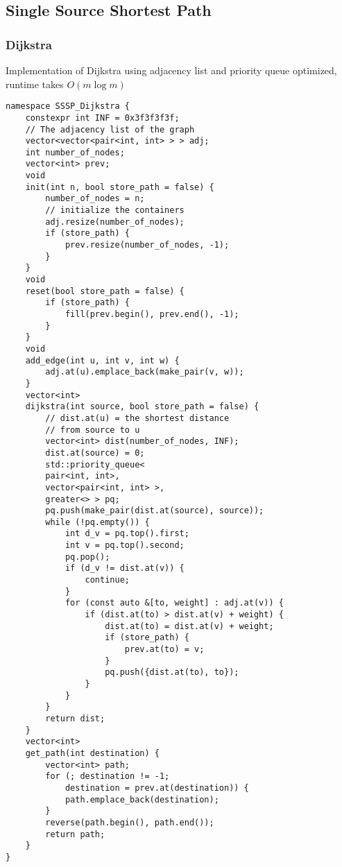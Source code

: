 \documentclass[10pt]{article}{\twocolumn}
\begin{document}
\subsection{Single Source Shortest Path}

\subsubsection{Dijkstra}
Implementation of Dijkstra using adjacency list and priority queue optimized, runtime takes $O(m\log{m})$
\begin{lstlisting}
namespace SSSP_Dijkstra {
    constexpr int INF = 0x3f3f3f3f;
    // The adjacency list of the graph
    vector<vector<pair<int, int> > > adj;
    int number_of_nodes;
    vector<int> prev;
    void
    init(int n, bool store_path = false) {
        number_of_nodes = n;
        // initialize the containers
        adj.resize(number_of_nodes);
        if (store_path) {
            prev.resize(number_of_nodes, -1);
        }
    }
    void
    reset(bool store_path = false) {
        if (store_path) {
            fill(prev.begin(), prev.end(), -1);
        }
    }
    void
    add_edge(int u, int v, int w) {
        adj.at(u).emplace_back(make_pair(v, w));
    }
    vector<int>
    dijkstra(int source, bool store_path = false) {
        // dist.at(u) = the shortest distance 
        // from source to u
        vector<int> dist(number_of_nodes, INF);
        dist.at(source) = 0;
        std::priority_queue<
        pair<int, int>, 
        vector<pair<int, int> >, 
        greater<> > pq;
        pq.push(make_pair(dist.at(source), source));
        while (!pq.empty()) {
            int d_v = pq.top().first;
            int v = pq.top().second;
            pq.pop();
            if (d_v != dist.at(v)) {
                continue;
            }
            for (const auto &[to, weight] : adj.at(v)) {
                if (dist.at(to) > dist.at(v) + weight) {
                    dist.at(to) = dist.at(v) + weight;
                    if (store_path) {
                        prev.at(to) = v;
                    }
                    pq.push({dist.at(to), to});
                }
            }
        }
        return dist;
    }
    vector<int>
    get_path(int destination) {
        vector<int> path;
        for (; destination != -1; 
            destination = prev.at(destination)) {
            path.emplace_back(destination);
        }
        reverse(path.begin(), path.end());
        return path;
    }
}
\end{lstlisting}
\end{document}
